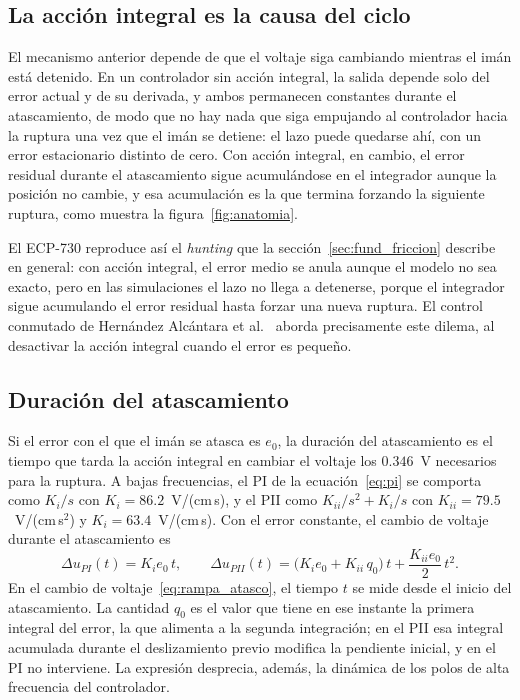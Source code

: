 \subsection{La acción integral es la causa del ciclo}

El mecanismo anterior depende de que el voltaje siga cambiando mientras el imán está detenido. En un controlador sin acción integral, la salida depende solo del error actual y de su derivada, y ambos permanecen constantes durante el atascamiento, de modo que no hay nada que siga empujando al controlador hacia la ruptura una vez que el imán se detiene: el lazo puede quedarse ahí, con un error estacionario distinto de cero. Con acción integral, en cambio, el error residual durante el atascamiento sigue acumulándose en el integrador aunque la posición no cambie, y esa acumulación es la que termina forzando la siguiente ruptura, como muestra la figura~\ref{fig:anatomia}.

El ECP-730 reproduce así el \emph{hunting} que la sección~\ref{sec:fund_friccion} describe en general: con acción integral, el error medio se anula aunque el modelo no sea exacto, pero en las simulaciones el lazo no llega a detenerse, porque el integrador sigue acumulando el error residual hasta forzar una nueva ruptura. El control conmutado de Hernández Alcántara et al.~\cite{alcantara} aborda precisamente este dilema, al desactivar la acción integral cuando el error es pequeño.

\subsection{Duración del atascamiento}

Si el error con el que el imán se atasca es $e_0$, la duración del atascamiento es el tiempo que tarda la acción integral en cambiar el voltaje los $0.346$~V necesarios para la ruptura. A bajas frecuencias, el PI de la ecuación~\eqref{eq:pi} se comporta como $K_i/s$ con $K_i=86.2$~V/(cm\,s), y el PII como $K_{ii}/s^2 + K_i/s$ con $K_{ii}=79.5$~V/(cm\,s$^2$) y $K_i=63.4$~V/(cm\,s). Con el error constante, el cambio de voltaje durante el atascamiento es
\begin{equation}
\Delta u_{PI}(t) = K_i e_0\, t, \qquad
\Delta u_{PII}(t) = \big(K_i e_0 + K_{ii}\, q_0\big)\, t + \frac{K_{ii} e_0}{2}\, t^2 .
\label{eq:rampa_atasco}
\end{equation}
En el cambio de voltaje~\eqref{eq:rampa_atasco}, el tiempo $t$ se mide desde el inicio del atascamiento. La cantidad $q_0$ es el valor que tiene en ese instante la primera integral del error, la que alimenta a la segunda integración; en el PII esa integral acumulada durante el deslizamiento previo modifica la pendiente inicial, y en el PI no interviene. La expresión desprecia, además, la dinámica de los polos de alta frecuencia del controlador.

